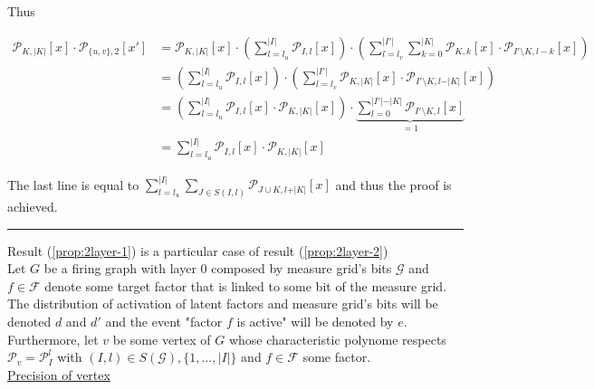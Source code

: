 \documentclass[a4paper, 11pt]{article}
\begin{document}
Thus 

\begin{align*}
\mathcal{P}_{K, \vert K \vert}\left[ x \right] \cdot \mathcal{P}_{\{u, v\}, 2} \left[ x' \right] &= \mathcal{P}_{K, \vert K \vert} \left[ x \right] \cdot \left( \sum_{l=l_u}^{\vert I \vert} \mathcal{P}_{I, l} \left[ x \right] \right) \cdot \left( \sum_{l=l_v}^{\vert I' \vert}  \sum_{k=0}^{\vert K \vert} \mathcal{P}_{K, k} \left[ x \right] \cdot \mathcal{P}_{I' \setminus K , l-k} \left[ x \right] \right) \\
&= \left( \sum_{l=l_u}^{\vert I \vert} \mathcal{P}_{I, l}\left[ x \right] \right) \cdot \left( \sum_{l=l_v}^{\vert I' \vert}  \mathcal{P}_{K, \vert K \vert}\left[ x \right] \cdot \mathcal{P}_{I' \setminus K , l- \vert K \vert} \left[ x \right] \right)\\
&= \left( \sum_{l=l_u}^{\vert I \vert} \mathcal{P}_{I, l}\left[ x \right] \cdot \mathcal{P}_{K, \vert K \vert}\left[ x \right] \right) \cdot \underbrace{ \sum_{l=0}^{\vert I' \vert - \vert K \vert} \mathcal{P}_{I' \setminus K , l}\left[ x \right]}_{=1}\\
&= \sum_{l=l_u}^{\vert I \vert} \mathcal{P}_{I, l}\left[ x \right] \cdot \mathcal{P}_{K, \vert K \vert}\left[ x \right]
\end{align*}

The last line is equal to $\sum_{l=l_u}^{\vert I \vert}  \sum_{J \in S(I, l)} \mathcal{P}_{J \cup K, l + \vert K \vert }\left[ x \right]$ and thus the proof is achieved.

\begin{center}
\rule[0pt]{100pt}{1pt} 
\end{center}

Result (\ref{prop:2layer-1}) is a particular case of result (\ref{prop:2layer-2})\\

Let $G$ be a firing graph with layer 0 composed by measure grid's bits $\mathcal{G}$ and $f \in \mathcal{F}$ denote some target factor that is linked to some bit of the measure grid. The distribution of activation of latent factors and measure grid's bits will be denoted  $d$ and $d'$ and the event "factor $f$ is active" will be denoted by $e$. Furthermore, let $v$ be some vertex of $G$ whose characteristic polynome respects $\mathcal{P}_v = \mathcal{P}_{I}^{l}$ with $(I, l) \in S(\mathcal{G}), \{1, \ldots, \vert I \vert\}$ and $f \in \mathcal{F}$ some factor.\\

\underline{Precision of vertex}\\
\end{document}
